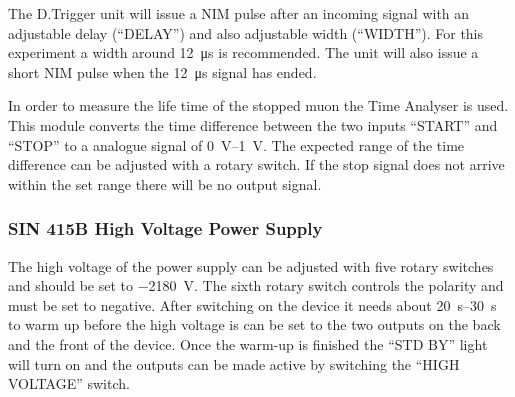 The D.Trigger unit will issue a NIM pulse after an incoming signal with an adjustable delay (``DELAY'') and also adjustable width (``WIDTH''). For this experiment a width around \SI{12}{\micro\second} is recommended. The unit will also issue a short NIM pulse when the \SI{12}{\micro\second} signal has ended.\par
In order to measure the life time of the stopped muon the Time Analyser is used. This module converts the time difference between the two inputs ``START'' and ``STOP'' to a analogue signal of \SIrange{0}{1}{\volt}. The expected range of the time difference can be adjusted with a rotary switch. If the stop signal does not arrive within the set range there will be no output signal.

\subsubsection*{SIN 415B High Voltage Power Supply}
The high voltage of the power supply can be adjusted with five rotary switches and should be set to \SI{-2180}{\volt}. The sixth rotary switch controls the polarity and must be set to negative. After switching on the device it needs about \SIrange{20}{30}{\second} to warm up before the high voltage is can be set to the two outputs on the back and the front of the device. Once the warm-up is finished the ``STD BY'' light will turn on and the outputs can be made active by switching the ``HIGH VOLTAGE'' switch.
